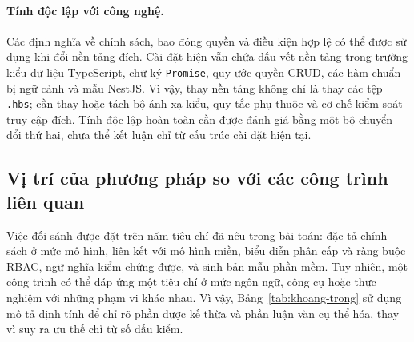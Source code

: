 \paragraph{Tính độc lập với công nghệ.}
Các định nghĩa về chính sách, bao đóng quyền và điều kiện hợp lệ có thể được sử dụng khi đổi nền tảng đích. Cài đặt hiện vẫn chứa dấu vết nền tảng trong trường kiểu dữ liệu TypeScript, chữ ký \texttt{Promise}, quy ước quyền CRUD, các hàm chuẩn bị ngữ cảnh và mẫu NestJS. Vì vậy, thay nền tảng không chỉ là thay các tệp \texttt{.hbs}; cần thay hoặc tách bộ ánh xạ kiểu, quy tắc phụ thuộc và cơ chế kiểm soát truy cập đích. Tính độc lập hoàn toàn cần được đánh giá bằng một bộ chuyển đổi thứ hai, chưa thể kết luận chỉ từ cấu trúc cài đặt hiện tại.

\subsection{Vị trí của phương pháp so với các công trình liên quan}
\label{subsec:doi-sanh}

Việc đối sánh được đặt trên năm tiêu chí đã nêu trong bài toán: đặc tả chính sách ở mức mô hình, liên kết với mô hình miền, biểu diễn phân cấp và ràng buộc RBAC, ngữ nghĩa kiểm chứng được, và sinh bản mẫu phần mềm. Tuy nhiên, một công trình có thể đáp ứng một tiêu chí ở mức ngôn ngữ, công cụ hoặc thực nghiệm với những phạm vi khác nhau. Vì vậy, Bảng~\ref{tab:khoang-trong} sử dụng mô tả định tính để chỉ rõ phần được kế thừa và phần luận văn cụ thể hóa, thay vì suy ra ưu thế chỉ từ số dấu kiểm.

